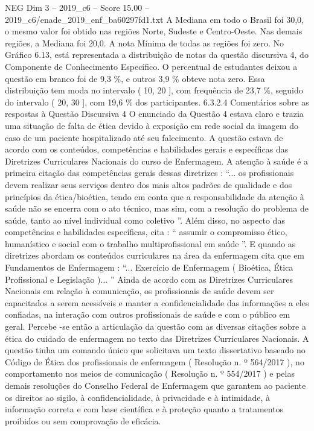 \begin{textsample}{NEG Dim 3 – 2019\_c6 – Score 15.00 – 2019\_c6/enade\_2019\_enf\_ba60297fd1.txt}
A Mediana em todo o Brasil foi 30,0, o mesmo valor foi obtido nas regiões Norte, Sudeste e Centro-Oeste.
Nas demais regiões, a Mediana foi 20,0.
A nota Mínima de todas as regiões foi zero.
No Gráfico 6.13, está representada a distribuição de notas da questão discursiva 4, do Componente de Conhecimento Específico.
O percentual de estudantes deixou a questão em branco foi de 9,3 \%, e outros 3,9 \% obteve nota zero.
Essa distribuição tem moda no intervalo ( 10, 20 ], com frequência de 23,7 \%, seguido do intervalo ( 20, 30 ], com 19,6 \% dos participantes. 6.3.2.4 Comentários sobre as respostas à Questão Discursiva 4 O enunciado da Questão 4 estava claro e trazia uma situação de falta de ética devido à exposição em rede social da imagem do caso de um paciente hospitalizado até seu falecimento.
A questão estava de acordo com os conteúdos, competências e habilidades gerais e específicas das Diretrizes Curriculares Nacionais do curso de Enfermagem.
A atenção à saúde é a primeira citação das competências gerais dessas diretrizes : “... os profissionais devem realizar seus serviços dentro dos mais altos padrões de qualidade e dos princípios da ética/bioética, tendo em conta que a responsabilidade da atenção à saúde não se encerra com o ato técnico, mas sim, com a resolução do problema de saúde, tanto ao nível individual como coletivo ”.
Além disso, no aspecto das competências e habilidades específicas, cita : “ assumir o compromisso ético, humanístico e social com o trabalho multiprofissional em saúde ”.
E quando as diretrizes abordam os conteúdos curriculares na área da enfermagem cita que em Fundamentos de Enfermagem : “...
Exercício de Enfermagem ( Bioética, Ética Profissional e Legislação )... ” Ainda de acordo com as Diretrizes Curriculares Nacionais em relação à comunicação, os profissionais de saúde devem ser capacitados a serem acessíveis e manter a confidencialidade das informações a eles confiadas, na interação com outros profissionais de saúde e com o público em geral.
Percebe -se então a articulação da questão com as diversas citações sobre a ética do cuidado de enfermagem no texto das Diretrizes Curriculares Nacionais.
A questão tinha um comando único que solicitava um texto dissertativo baseado no Código de Ética dos profissionais de enfermagem ( Resolução n. º 564/2017 ), no comportamento nos meios de comunicação ( Resolução n. º 554/2017 ) e pelas demais resoluções do Conselho Federal de Enfermagem que garantem ao paciente os direitos ao sigilo, à confidencialidade, à privacidade e à intimidade, à informação correta e com base científica e à proteção quanto a tratamentos proibidos ou sem comprovação de eficácia.

\end{textsample}
